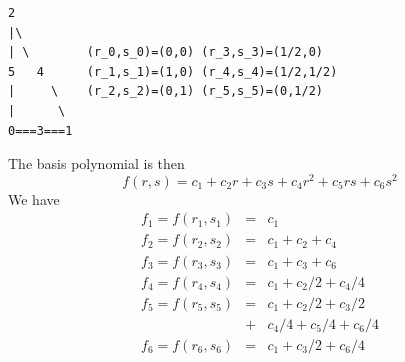\begin{verbatim}
2            
|\
| \        (r_0,s_0)=(0,0) (r_3,s_3)=(1/2,0)
5   4      (r_1,s_1)=(1,0) (r_4,s_4)=(1/2,1/2)
|     \    (r_2,s_2)=(0,1) (r_5,s_5)=(0,1/2)
|      \ 
0===3===1
\end{verbatim}
The basis polynomial is then
\[
f(r,s) = c_1 + c_2 r + c_3 s + c_4  r^2 + c_5 rs  + c_6 s^2
\]
We have 
\begin{eqnarray}
f_1 = f(r_1,s_1) &=& c_1 \nonumber\\
f_2 = f(r_2,s_2) &=& c_1 + c_2 + c_4\nonumber\\
f_3 = f(r_3,s_3) &=& c_1 + c_3 + c_6\nonumber\\
f_4 = f(r_4,s_4) &=& c_1 + c_2/2 + c_4/4\nonumber\\
f_5 = f(r_5,s_5) &=& c_1 + c_2/2 + c_3/2 \nonumber\\
                 &+& c_4/4 + c_5/4 + c_6/4\nonumber\\
f_6 = f(r_6,s_6) &=& c_1 + c_3/2 + c_6/4\nonumber
\end{eqnarray}

